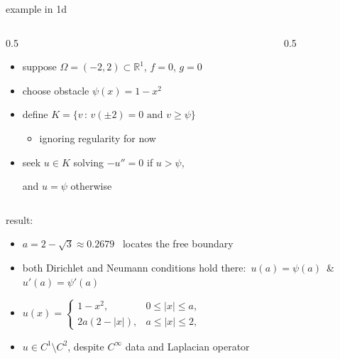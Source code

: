 \documentclass[aspectratio=169,10pt]{beamer}
\newcommand{\RR}{{\mathbb{R}}}
\newcommand{\lc}{{\text{\large $\circ$}}}
\begin{document}
\begin{frame}{example in 1d}

\begin{columns}
\begin{column}{0.5\textwidth}
\begin{itemize}
\item suppose $\Omega=(-2,2)\subset \RR^1$, $f=0$, $g=0$
\item choose obstacle $\psi(x) = 1-x^2$
\item define $K=\{v \,:\, v(\pm 2)=0 \text{ and } v \ge \psi\}$
    \begin{itemize}
    \item[$\lc$] ignoring regularity for now
    \end{itemize}
\item \alert{seek $u\in K$ solving $-u''=0$ if $u>\psi$,}

\alert{and $u=\psi$ otherwise}
\end{itemize}
\end{column}
\begin{column}{0.5\textwidth}
\hfill 
\end{column}
\end{columns}

\medskip
result:
\begin{itemize}
\item $a=2 - \sqrt{3}\approx 0.2679$ \, locates the \alert{free boundary}
\item both \alert{Dirichlet and Neumann conditions} hold there:\, $u(a)=\psi(a)$ \,\&\, $u'(a)=\psi'(a)$
\item $\displaystyle u(x) = \begin{cases} 1-x^2, & 0 \le |x| \le a, \\
                           2a(2-|x|), & a \le |x| \le 2, \end{cases}$
\item $u\in C^1 \setminus C^2$, despite $C^\infty$ data and Laplacian operator
\end{itemize}
\end{frame}
\end{document}
